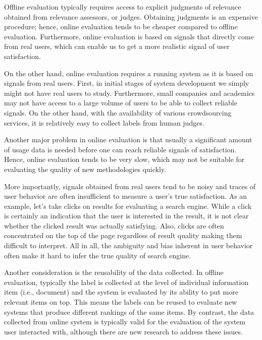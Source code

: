 Offline evaluation typically requires access to explicit judgments of relevance obtained from relevance assessors, or judges. Obtaining judgments is an expensive procedure; hence, online evaluation tends to be cheaper compared to offline evaluation. Furthermore, online evaluation is based on signals that directly come from real users, which can enable us to get a more realistic signal of user satisfaction. 

On the other hand, online evaluation requires a running system as it is based on signals from real users. First, in initial stages of system development we simply might not have real users to study. Furthermore, small companies and academics may not have access to a large volume of users to be able to collect reliable signals. On the other hand, with the availability of various crowdsourcing services, it is relatively easy to collect labels from human judges.

Another major problem in online evaluation is that usually a significant amount of usage data is needed before one can reach reliable signals of satisfaction.  Hence, online evaluation tends to be very slow, which may not be suitable for evaluating the quality of new methodologies quickly. %

More importantly, signals obtained from real users tend to be noisy and traces of user behavior are often insufficient to measure a user's true satisfaction. As an example, let's take clicks on results for evaluating a search engine. While a click is certainly an indication that the user is interested in the result, it is not clear whether the clicked result was actually satisfying. \cite{} Also, clicks are often concentrated on the top of the page regardless of result quality  \cite{} making them difficult to interpret. All in all, the ambiguity and bias inherent in user behavior often make it hard to infer the true quality of search engine. 

Another consideration is the reusability of the data collected. In offline evaluation, typically the label is collected at the level of individual information item (i.e., document) and the system is evaluated by its ability to put more relevant items on top. This means the labels can be reused to evaluate new systems that produce different rankings of the same items. By contrast, the data collected from online system is typically valid for the evaluation of the system user interacted with, although there are new research to address these issues.

